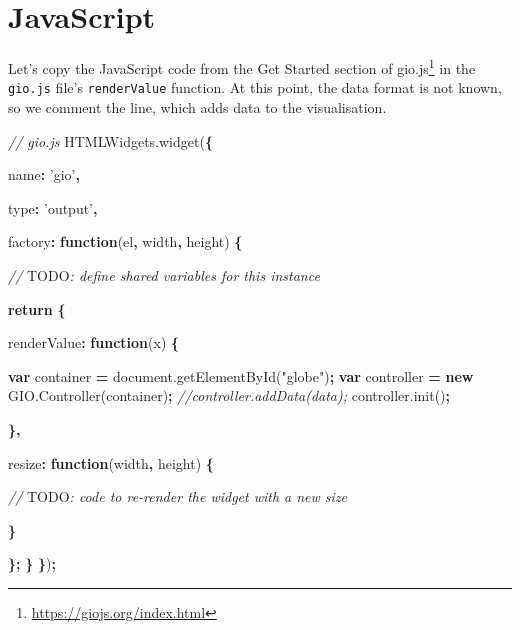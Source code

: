 \documentclass[10pt,]{krantz}
\makeatletter
\newenvironment{Shaded}{\begin{snugshade}}{\end{snugshade}}
\newcommand{\AlertTok}[1]{\textcolor[rgb]{0.33,0.33,0.33}{#1}}
\newcommand{\AttributeTok}[1]{\textcolor[rgb]{0.61,0.61,0.61}{#1}}
\newcommand{\CommentTok}[1]{\textcolor[rgb]{0.37,0.37,0.37}{\textit{#1}}}
\newcommand{\ControlFlowTok}[1]{\textcolor[rgb]{0.27,0.27,0.27}{\textbf{#1}}}
\newcommand{\DataTypeTok}[1]{\textcolor[rgb]{0.27,0.27,0.27}{#1}}
\newcommand{\KeywordTok}[1]{\textcolor[rgb]{0.27,0.27,0.27}{\textbf{#1}}}
\newcommand{\NormalTok}[1]{#1}
\newcommand{\OperatorTok}[1]{\textcolor[rgb]{0.43,0.43,0.43}{\textbf{#1}}}
\newcommand{\StringTok}[1]{\textcolor[rgb]{0.5,0.5,0.5}{#1}}
\newcommand{\VariableTok}[1]{\textcolor[rgb]{0,0,0}{#1}}
\renewcommand{\href}[2]{#2\footnote{\url{#1}}}
\newenvironment{kframe}{%
\medskip{}
\setlength{\fboxsep}{.8em}
 \def\at@end@of@kframe{}%
 \ifinner\ifhmode%
  \def\at@end@of@kframe{\end{minipage}}%
  \begin{minipage}{\columnwidth}%
 \fi\fi%
 \def\FrameCommand##1{\hskip\@totalleftmargin \hskip-\fboxsep
 \colorbox{shadecolor}{##1}\hskip-\fboxsep
     \hskip-\linewidth \hskip-\@totalleftmargin \hskip\columnwidth}%
 \MakeFramed {\advance\hsize-\width
   \@totalleftmargin\z@ \linewidth\hsize
   \@setminipage}}%
 {\par\unskip\endMakeFramed%
 \at@end@of@kframe}
\renewenvironment{Shaded}{\begin{kframe}}{\end{kframe}}
\makeatother
\begin{document}
\hypertarget{widgets-full-js}{%
\section{JavaScript}\label{widgets-full-js}}

Let's copy the JavaScript code from the \href{https://giojs.org/index.html}{Get Started section of gio.js} in the \texttt{gio.js} file's \texttt{renderValue} function. At this point, the data format is not known, so we comment the line, which adds data to the visualisation.

\begin{Shaded}
\begin{Highlighting}[]
\CommentTok{// gio.js}
\VariableTok{HTMLWidgets}\NormalTok{.}\AttributeTok{widget}\NormalTok{(}\OperatorTok{\{}

  \DataTypeTok{name}\OperatorTok{:} \StringTok{'gio'}\OperatorTok{,}

  \DataTypeTok{type}\OperatorTok{:} \StringTok{'output'}\OperatorTok{,}

  \DataTypeTok{factory}\OperatorTok{:} \KeywordTok{function}\NormalTok{(el}\OperatorTok{,}\NormalTok{ width}\OperatorTok{,}\NormalTok{ height) }\OperatorTok{\{}

    \CommentTok{// }\AlertTok{TODO}\CommentTok{: define shared variables for this instance}

    \ControlFlowTok{return} \OperatorTok{\{}

      \DataTypeTok{renderValue}\OperatorTok{:} \KeywordTok{function}\NormalTok{(x) }\OperatorTok{\{}

        \KeywordTok{var}\NormalTok{ container }\OperatorTok{=} \VariableTok{document}\NormalTok{.}\AttributeTok{getElementById}\NormalTok{(}\StringTok{"globe"}\NormalTok{)}\OperatorTok{;}
        \KeywordTok{var}\NormalTok{ controller }\OperatorTok{=} \KeywordTok{new} \VariableTok{GIO}\NormalTok{.}\AttributeTok{Controller}\NormalTok{(container)}\OperatorTok{;}
        \CommentTok{//controller.addData(data);}
        \VariableTok{controller}\NormalTok{.}\AttributeTok{init}\NormalTok{()}\OperatorTok{;}

      \OperatorTok{\},}

      \DataTypeTok{resize}\OperatorTok{:} \KeywordTok{function}\NormalTok{(width}\OperatorTok{,}\NormalTok{ height) }\OperatorTok{\{}

        \CommentTok{// }\AlertTok{TODO}\CommentTok{: code to re-render the widget with a new size}

      \OperatorTok{\}}

    \OperatorTok{\};}
  \OperatorTok{\}}
\OperatorTok{\}}\NormalTok{)}\OperatorTok{;}
\end{Highlighting}
\end{Shaded}
\end{document}
